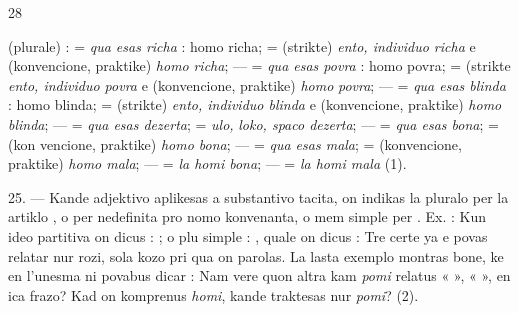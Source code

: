 \begin{VUpage}[32]{28}

\VUcontinue (plurale) :  = \textit{qua esas richa} : homo richa;  =\nl
(strikte) \textit{ento, individuo richa} e (konvencione, praktike) \textit{homo}\nl
\textit{richa}; ---  = \textit{qua esas povra} : homo povra;  =\nl
(strikte \textit{ento, individuo povra} e (konvencione, praktike) \textit{homo}\nl
\textit{povra}; ---  = \textit{qua esas blinda} : homo blinda; \nl
= (strikte) \textit{ento, individuo blinda} e (konvencione, praktike)\nl
\textit{homo blinda}; ---  = \textit{qua esas dezerta};  = \textit{ulo,}\nl
\textit{loko, spaco dezerta}; ---  = \textit{qua esas bona};  = (kon\cc
vencione, praktike) \textit{homo bona}; ---  = \textit{qua esas mala};\nl
{} = (konvencione, praktike) \textit{homo mala}; ---  =\nl
\textit{la homi bona}; ---  = \textit{la homi mala} (1).

\VUblanc{7.75pt}%
25. --- Kande adjektivo aplikesas a substantivo tacita, on\nl
indikas la pluralo per la artiklo , o per nedefinita pro\cc
nomo konvenanta, o mem simple per . Ex. : \nl
{} Kun ideo partitiva on dicus :\nl
{}\nl
{}; o plu simple : , quale on dicus : \nl
{} Tre certe ya  e  povas relatar nur rozi,\nl
sola kozo pri qua on parolas. La lasta exemplo montras\nl
bone, ke en l'unesma ni povabus dicar : \nl
{} Nam vere quon altra kam \textit{pomi} relatus « \nl
{} », «  », en ica frazo? Kad on komprenus \textit{homi},\nl
kande traktesas nur \textit{pomi}? (2).


\end{VUpage}
